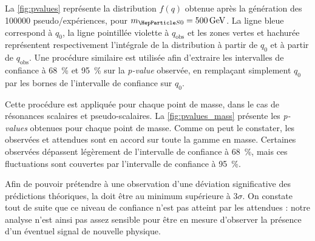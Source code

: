 La \cref{fig:pvalues} représente la distribution $f(q)$ obtenue après la génération des \num{100 000} pseudo\-/expériences, pour $\msz = \SI{500}{\GeV}$. La ligne bleue correspond à $q_0$, la ligne pointillée violette à $q_\text{obs}$ et les zones vertes et hachurée représentent respectivement l'intégrale de la distribution à partir de $q_0$ et à partir de $q_\text{obs}$. Une procédure similaire est utilisée afin d'extraire les intervalles de confiance à \SI{68}{\percent} et \SI{95}{\percent} sur la \emph{p-value} observée, en remplaçant simplement $q_0$ par les bornes de l'intervalle de confiance sur $q_0$.

\bigskip

Cette procédure est appliquée pour chaque point de masse, dans le cas de résonances scalaires et pseudo-scalaires. La \cref{fig:pvalues_mass} présente les \emph{p-values} obtenues pour chaque point de masse. Comme on peut le constater, les \pvalues observées et attendues sont en accord sur toute la gamme en masse. Certaines \pvalue observées dépassent légèrement de l'intervalle de confiance à \SI{68}{\%}, mais ces fluctuations sont couvertes par l'intervalle de confiance à \SI{95}{\%}.

\medskip

Afin de pouvoir prétendre à une observation d'une déviation significative des prédictions théoriques, la \pvalue doit être au minimum supérieure à $3\sigma$. On constate tout de suite que ce niveau de confiance n'est pas atteint par les \pvalues attendues : notre analyse n'est ainsi pas assez sensible pour être en mesure d'observer la présence d'un éventuel signal de nouvelle physique.

